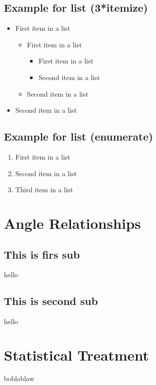 \documentclass[paper=a4, fontsize=11pt]{scrartcl}
\numberwithin{equation}{section}		%
\numberwithin{figure}{section}			%
\numberwithin{table}{section}				%
\begin{document}
\subsection{Example for list (3*itemize)}
\begin{itemize}
	\item First item in a list 
		\begin{itemize}
		\item First item in a list 
			\begin{itemize}
			\item First item in a list 
			\item Second item in a list 
			\end{itemize}
		\item Second item in a list 
		\end{itemize}
	\item Second item in a list 
\end{itemize}

\subsection{Example for list (enumerate)}
\begin{enumerate}
	\item First item in a list 
	\item Second item in a list 
	\item Third item in a list
\end{enumerate}


\begin{appendices}
\section{Angle Relationships}
\subsection{This is firs sub}
hello

\subsection{This is second sub}
hello
\section{Statistical Treatment}
bobloblaw
\end{appendices}




\end{document}

